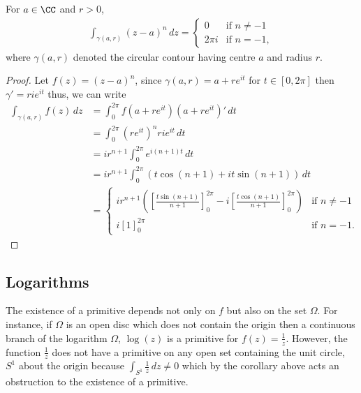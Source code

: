 \documentclass[12pt, a4paper]{article}
\begin{document}
\begin{mdthm}
    For \(a \in \CC\) and \(r>0\),
    \[\begin{aligned}
        \int_{\gamma(a,r)} (z-a)^n \, dz =\begin{cases}
            0 &\text{if } n \neq -1 \\
            2\pi i &\text{if } n=-1,
        \end{cases}
    \end{aligned}\]
    where \(\gamma(a,r)\) denoted the circular contour having centre \(a\) and radius \(r\).
\end{mdthm}

\begin{proof}
    Let \(f(z) = (z-a)^n\), since \(\gamma(a,r) = a+re^{it}\) for \(t \in [0,2\pi]\) then \(\gamma' = rie^{it}\) thus, we can write 
    \[\begin{aligned}
        \int_{\gamma(a,r)} f(z) \, dz &= \int_{0}^{2\pi} f(a+re^{it}) (a+re^{it})' \, dt \\
        &= \int_{0}^{2\pi} (re^{it})^n rie^{it} \, dt \\
        &= ir^{n+1} \int_{0}^{2\pi} e^{i(n+1)t} \, dt \\
        &= ir^{n+1} \int_{0}^{2\pi} \left( t\cos(n+1) +it \sin (n+1) \right) \, dt \\
        &= \begin{cases}
            ir^{n+1} \left( \left[ \frac{t\sin(n+1)}{n+1} \right]_0^{2\pi} - i \left[ \frac{t\cos(n+1)}{n+1} \right]_0^{2\pi} \right) &\text{if } n\neq -1 \\
            i[1]_0^{2\pi} &\text{if } n=-1.
        \end{cases}
    \end{aligned}\]
\end{proof}

\subsection{Logarithms}

The existence of a primitive depends not only on \(f\) but also on the set \(\Omega\). For instance, if \(\Omega\) is an open disc which does not contain the origin then a continuous branch of the logarithm \(\Omega\), \(\log(z)\) is a primitive for \(f(z)=\frac{1}{z}\). However, the function \(\frac{1}{z}\) does not have a primitive on any open set containing the unit circle, \(S^1\) about the origin because \(\int_{S^1} \frac{1}{z} \, dz \neq 0\) which by the corollary above acts an obstruction to the existence of a primitive.
\end{document}
